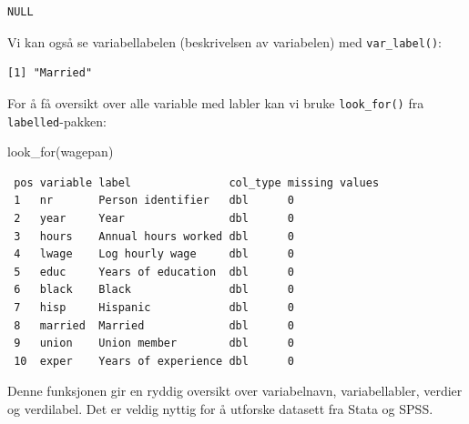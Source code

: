 \documentclass[
  norsk,
  letterpaper,
  DIV=11,
  numbers=noendperiod]{scrreprt}
\newenvironment{Shaded}{\begin{snugshade}}{\end{snugshade}}
\newcommand{\FunctionTok}[1]{\textcolor[rgb]{0.28,0.35,0.67}{#1}}
\newcommand{\NormalTok}[1]{\textcolor[rgb]{0.00,0.23,0.31}{#1}}
\newcommand{\SpecialCharTok}[1]{\textcolor[rgb]{0.37,0.37,0.37}{#1}}
\theoremstyle{definition}
\theoremstyle{remark}
\begin{document}
\begin{Shaded}
\end{Shaded}

\begin{verbatim}
NULL
\end{verbatim}

Vi kan også se variabellabelen (beskrivelsen av variabelen) med
\texttt{var\_label()}:

\begin{Shaded}
\end{Shaded}

\begin{verbatim}
[1] "Married"
\end{verbatim}

For å få oversikt over alle variable med labler kan vi bruke
\texttt{look\_for()} fra \texttt{labelled}-pakken:

\begin{Shaded}
\begin{Highlighting}[]
\FunctionTok{look\_for}\NormalTok{(wagepan)}
\end{Highlighting}
\end{Shaded}

\begin{verbatim}
 pos variable label               col_type missing values
 1   nr       Person identifier   dbl      0             
 2   year     Year                dbl      0             
 3   hours    Annual hours worked dbl      0             
 4   lwage    Log hourly wage     dbl      0             
 5   educ     Years of education  dbl      0             
 6   black    Black               dbl      0             
 7   hisp     Hispanic            dbl      0             
 8   married  Married             dbl      0             
 9   union    Union member        dbl      0             
 10  exper    Years of experience dbl      0             
\end{verbatim}

Denne funksjonen gir en ryddig oversikt over variabelnavn,
variabellabler, verdier og verdilabel. Det er veldig nyttig for å
utforske datasett fra Stata og SPSS.
\end{document}
